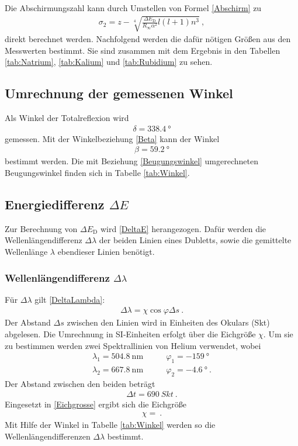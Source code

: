 Die Abschirmungszahl kann durch Umstellen von Formel \eqref{Abschirm} zu
\begin{align}
	\sigma_2 = z - \sqrt[4]{\frac{\Delta E_\text{D}}{R_\infty\alpha^2}l(l+1)n^3} \ ,
\end{align}
direkt berechnet werden. Nachfolgend werden die dafür nötigen Größen aus den Messwerten bestimmt. Sie sind zusammen mit dem Ergebnis in den Tabellen \ref{tab:Natrium}, \ref{tab:Kalium} und \ref{tab:Rubidium} zu sehen.
\subsection{Umrechnung der gemessenen Winkel \label{sec:Umrechnung}}
Als Winkel der Totalreflexion wird
\begin{align}
	\delta = \SI{338.4}{\degree}
\end{align}
gemessen. Mit der Winkelbeziehung \eqref{Beta} kann der Winkel
\begin{align}
	\beta = \SI{59.2}{\degree}
\end{align}
bestimmt werden. Die mit Beziehung \eqref{Beugungswinkel} umgerechneten Beugungswinkel finden sich in Tabelle \ref{tab:Winkel}.

\subsection{Energiedifferenz $\Delta E$}
Zur Berechnung von $\Delta E_\text{D}$ wird \eqref{DeltaE} herangezogen. Dafür werden die Wellenlängendifferenz $\Delta\lambda$ der beiden Linien eines Dubletts, sowie die gemittelte Wellenlänge $\lambda$ ebendieser Linien benötigt.
\subsubsection{Wellenlängendifferenz $\Delta\lambda$}
Für $\Delta\lambda$ gilt \eqref{DeltaLambda}:
\begin{align}
	\Delta\lambda = \chi\cos\varphi\Delta s \ .
\end{align}
Der Abstand $\Delta s$ zwischen den Linien wird in Einheiten des Okulars  (\si{Skt}) abgelesen. Die Umrechnung in SI-Einheiten erfolgt über die Eichgröße $\chi$. Um sie zu bestimmen werden zwei Spektrallinien von Helium verwendet, wobei
\begin{align}
	\lambda_1 = \SI{504.8}{\nano\meter} \qquad& \varphi_1 = \SI{-159}{\degree} \\
	\lambda_2 = \SI{667.8}{\nano\meter} \qquad& \varphi_2 = \SI{-4.6}{\degree} \ .
\end{align}
Der Abstand zwischen den beiden beträgt
\begin{align}
	\Delta t = \SI{690}{Skt} \ .
\end{align}
Eingesetzt in \eqref{Eichgrosse} ergibt sich die Eichgröße
\begin{align}
	\chi =  \ .
\end{align}
Mit Hilfe der Winkel in Tabelle \ref{tab:Winkel} werden so die Wellenlängendifferenzen $\Delta\lambda$ bestimmt.

